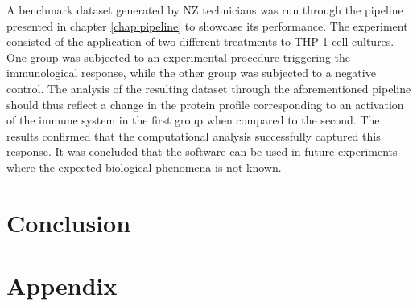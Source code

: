 \documentclass[11pt, a4paper]{report}
\begin{document}
A benchmark dataset generated by \ac{NZ} technicians was run through the pipeline presented in chapter \ref{chap:pipeline} to showcase its performance. The experiment consisted of the application of two different treatments to THP-1 cell cultures. One group was subjected to an experimental procedure triggering the immunological response, while the other group was subjected to a negative control. The analysis of the resulting dataset through the aforementioned pipeline should thus reflect a change in the protein profile corresponding to an activation of the immune system in the first group when compared to the second. The results confirmed that the computational analysis successfully captured this response. It was concluded that the software can be used in future experiments where the expected biological phenomena is not known.



\chapter*{Conclusion}
\label{chap:conclusion}

\chapter*{Appendix}
\label{chap:appendix}





\footnotesize{}
\end{document}
